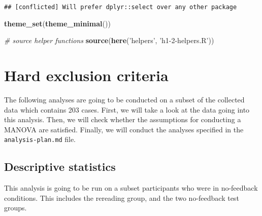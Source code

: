 \documentclass[12pt,]{article}
\newenvironment{Shaded}{\begin{snugshade}}{\end{snugshade}}
\newcommand{\CommentTok}[1]{\textcolor[rgb]{0.56,0.35,0.01}{\textit{#1}}}
\newcommand{\KeywordTok}[1]{\textcolor[rgb]{0.13,0.29,0.53}{\textbf{#1}}}
\newcommand{\NormalTok}[1]{#1}
\newcommand{\OperatorTok}[1]{\textcolor[rgb]{0.81,0.36,0.00}{\textbf{#1}}}
\newcommand{\StringTok}[1]{\textcolor[rgb]{0.31,0.60,0.02}{#1}}
\begin{document}
\begin{verbatim}
## [conflicted] Will prefer dplyr::select over any other package
\end{verbatim}

\begin{Shaded}
\begin{Highlighting}[]
\KeywordTok{theme_set}\NormalTok{(}\KeywordTok{theme_minimal}\NormalTok{())}

\CommentTok{# source helper functions}
\KeywordTok{source}\NormalTok{(}\KeywordTok{here}\NormalTok{(}\StringTok{'helpers'}\NormalTok{, }\StringTok{'h1-2-helpers.R'}\NormalTok{))}
\end{Highlighting}
\end{Shaded}

\hypertarget{hard-exclusion-criteria}{%
\section{Hard exclusion criteria}\label{hard-exclusion-criteria}}

The following analyses are going to be conducted on a subset of the
collected data which contains 203 cases. First, we will take a look at
the data going into this analysis. Then, we will check whether the
assumptions for conducting a MANOVA are satisfied. Finally, we will
conduct the analyses specified in the \texttt{analysis-plan.md} file.

\hypertarget{descriptive-statistics}{%
\subsection{Descriptive statistics}\label{descriptive-statistics}}

This analysis is going to be run on a subset participants who were in
no-feedback conditions. This includes the rereading group, and the two
no-feedback test groups.

\begin{Shaded}
\end{Shaded}
\end{document}
